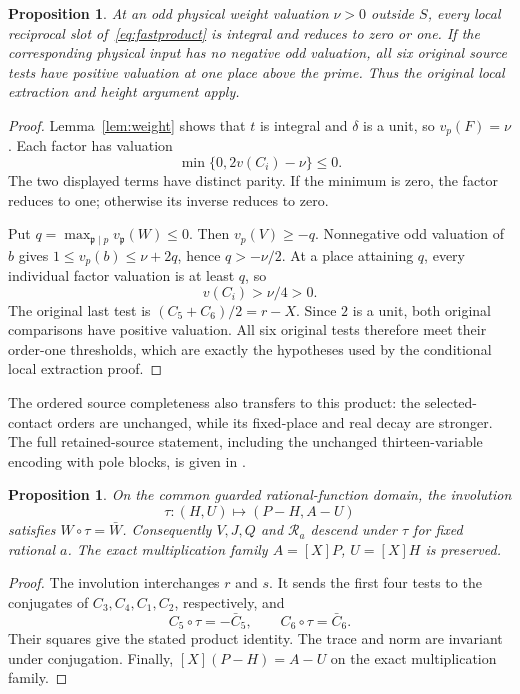 \documentclass[11pt,a4paper]{article}
\newtheorem{proposition}[theorem]{Proposition}
\begin{document}
\begin{proposition}\label{prop:conditional}
At an odd physical weight valuation $\nu>0$ outside $S$, every local
reciprocal slot of~\eqref{eq:fastproduct} is integral and reduces to
zero or one. If the corresponding physical input has no negative odd
valuation, all six original source tests have positive valuation at
one place above the prime. Thus the original local extraction and
height argument apply.
\end{proposition}
\begin{proof}
Lemma~\ref{lem:weight} shows that $t$ is integral and $\delta$ is a
unit, so $v_p(F)=\nu$. Each factor has valuation
\[
                    \min\{0,2v(C_i)-\nu\}\le0.
\]
The two displayed terms have distinct parity. If the minimum is zero,
the factor reduces to one; otherwise its inverse reduces to zero.

Put $q=\max_{\mathfrak p\mid p}v_{\mathfrak p}(W)\le0$.
Then $v_p(V)\ge-q$. Nonnegative odd valuation of $b$ gives
$1\le v_p(b)\le\nu+2q$, hence $q>-\nu/2$. At a place attaining
$q$, every individual factor valuation is at least $q$, so
\[
                         v(C_i)>\nu/4>0.
\]
The original last test is $(C_5+C_6)/2=r-X$. Since $2$ is a unit,
both original comparisons have positive valuation. All six original
tests therefore meet their order-one thresholds, which are exactly
the hypotheses used by the conditional local extraction proof.
\end{proof}

The ordered source completeness also transfers to this product: the
selected-contact orders are unchanged, while its fixed-place and real
decay are stronger. The full retained-source statement, including the
unchanged thirteen-variable encoding with pole blocks, is given in
\cite{Normalized}.

\begin{proposition}\label{prop:symmetry}
On the common guarded rational-function domain, the involution
\[
                         \tau:(H,U)\longmapsto(P-H,A-U)
\]
satisfies $W\circ\tau=\bar W$. Consequently $V,J,Q$ and
$\mathcal R_a$ descend under $\tau$ for fixed rational $a$.
The exact multiplication family $A=[X]P$, $U=[X]H$ is preserved.
\end{proposition}
\begin{proof}
The involution interchanges $r$ and $s$. It sends the first four
tests to the conjugates of $C_3,C_4,C_1,C_2$, respectively, and
\[
                C_5\circ\tau=-\bar C_5,\qquad
                C_6\circ\tau=\bar C_6.
\]
Their squares give the stated product identity. The trace and norm
are invariant under conjugation. Finally,
$[X](P-H)=A-U$ on the exact multiplication family.
\end{proof}
\end{document}
